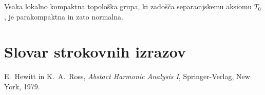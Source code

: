 \documentclass[mat1]{fmfdelo}
\begin{document}
\begin{izrek}\label{izr:t4}
	Vsaka lokalno kompaktna topološka grupa, ki zadošča separacijskemu aksiomu $T_0$, je parakompaktna in zato normalna.
\end{izrek}

\section*{Slovar strokovnih izrazov}

\geslo{}{}
\geslo{}{}

\begin{thebibliography}{99}

E.~Hewitt in K.~A.~Ross, \emph{Abstact Harmonic Analysis I}, Springer-Verlag, New York, 1979.

\end{thebibliography}
\end{document}
